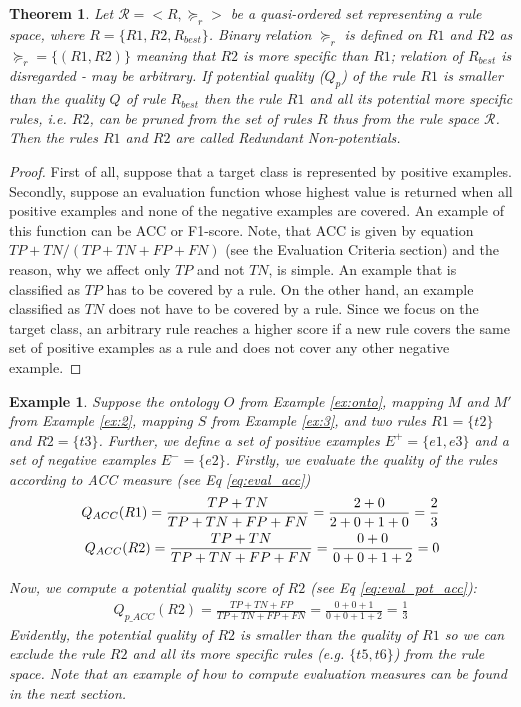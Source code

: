 \documentclass{bmcart}
\newtheorem{example}{Example}
\newtheorem{theorem}{Theorem}
\begin{document}
\begin{theorem}
    Let $\mathcal{R} = <R, \succeq_{r}>$ be a quasi-ordered set representing a rule space, where $R = \{R1, R2, R_{best}\}$. Binary relation $\succeq_{r}$ is defined on $R1$ and $R2$ as $\succeq_{r} = \{(R1, R2)\}$ meaning that $R2$ is more specific than $R1$; relation of $R_{best}$ is disregarded - may be arbitrary. If potential quality ($Q_p$) of the rule $R1$ is smaller than the quality $Q$ of rule $R_{best}$ then the rule $R1$ and all its potential more specific rules, i.e. $R2$, can be pruned from the set of rules $R$ thus from the rule space $\mathcal{R}$. Then the rules $R1$ and $R2$ are called \textit{Redundant Non-potentials}.
\end{theorem}

\begin{proof}
   First of all, suppose that a target class is represented by positive examples. Secondly, suppose an evaluation function whose highest value is returned when all positive examples and none of the negative examples are covered. An example of this function can be ACC or F1-score. Note, that ACC is given by equation $TP+TN/(TP+TN+FP+FN)$ (see the Evaluation Criteria section) and the reason, why we affect only $TP$ and not $TN$, is simple. An example that is classified as $TP$ has to be covered by a rule. On the other hand, an example classified as $TN$ does not have to be covered by a rule. Since we focus on the target class, an arbitrary rule reaches a higher score if a new rule covers the same set of positive examples as a rule and does not cover any other negative example.
\end{proof}


\begin{example}\label{ex:non_pot}
Suppose the ontology $O$ from Example \ref{ex:onto}, mapping $M$ and $M'$ from Example \ref{ex:2}, mapping $S$ from Example \ref{ex:3}, and two rules $R1=\{t2\}$ and $R2=\{t3\}$. Further, we define a set of positive examples $E^{+}=\{e1, e3\}$ and a set of negative examples $E^{-}=\{e2\}$. Firstly, we evaluate the quality of the rules according to ACC measure (see Eq \ref{eq:eval_acc})
\begin{eqnarray}
\label{eq:exampleacc}
	{\small Q_{ACC}(R1) = \frac{TP + TN}{TP + TN + FP + FN} = \frac{2 + 0}{2 + 0 + 1 + 0} = \frac{2}{3}} \\
Q_{ACC}(R2) = \frac{TP + TN}{TP + TN + FP + FN} = \frac{0 + 0}{0 + 0 + 1 + 2} = 0
\end{eqnarray}

Now, we compute a potential quality score of $R2$ (see Eq \ref{eq:eval_pot_acc}):
\begin{eqnarray}
\label{eq:exampleaccpot}
Q_{p\_ACC}(R2) = \frac{TP + TN + FP}{TP + TN + FP + FN}= \frac{0 + 0 + 1}{0 + 0 + 1 + 2} = \frac{1}{3}
\end{eqnarray}
Evidently, the potential quality of $R2$ is smaller than the quality of $R1$ so we can exclude the rule $R2$ and all its more specific rules (e.g. $\{t5, t6\}$) from the rule space. Note that an example of how to compute evaluation measures can be found in the next section.

\end{example}
\end{document}
